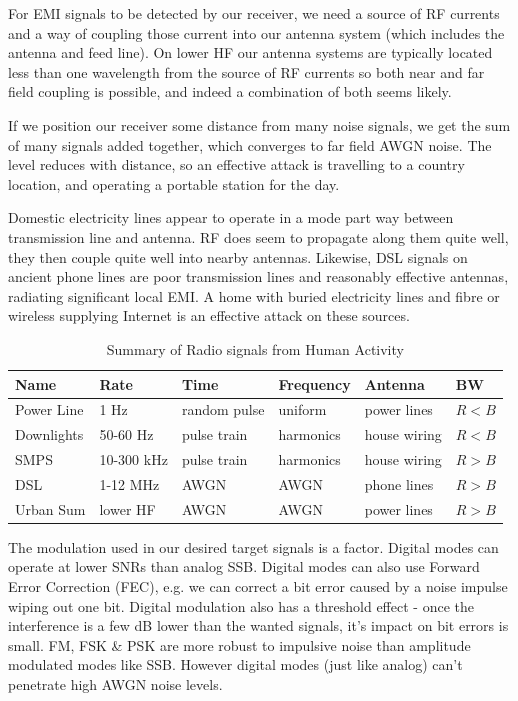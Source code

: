 \documentclass{article}
\begin{document}
For EMI signals to be detected by our receiver, we need a source of RF currents and a way of coupling those current into our antenna system (which includes the antenna and feed line).  On lower HF our antenna systems are typically located less than one wavelength from the source of RF currents so both near and far field coupling is possible, and indeed a combination of both seems likely.

If we position our receiver some distance from many noise signals, we get the sum of many signals added together, which converges to far field AWGN noise.  The level reduces with distance, so an effective attack is travelling to a country location, and operating a portable station for the day.

Domestic electricity lines appear to operate in a mode part way between transmission line and antenna.  RF does seem to propagate along them quite well, they then couple quite well into nearby antennas.  Likewise, DSL signals on ancient phone lines are poor transmission lines and reasonably effective antennas, radiating significant local EMI. A home with buried electricity lines and fibre or wireless supplying Internet is an effective attack on these sources.

\begin{table}[h]
\centering
\begin{tabular}{l l l l l l}
 \hline
 Name & Rate & Time & Frequency & Antenna & BW \\
 \hline
 Power Line & 1 Hz & random pulse & uniform & power lines & $R < B$ \\
 Downlights & 50-60 Hz & pulse train & harmonics & house wiring & $R < B$ \\
 SMPS & 10-300 kHz & pulse train & harmonics & house wiring & $R > B$ \\
 DSL & 1-12 MHz & AWGN & AWGN & phone lines & $R > B$ \\
 Urban Sum & lower HF & AWGN & AWGN & power lines & $R > B$ \\
 \hline
\end{tabular}
\caption{Summary of Radio signals from Human Activity}
\label{table:human_noise}
\end{table}

The modulation used in our desired target signals is a factor.  Digital modes can operate at lower SNRs than analog SSB.  Digital modes can also use Forward Error Correction (FEC), e.g. we can correct a bit error caused by a noise impulse wiping out one bit.  Digital modulation also has a threshold effect - once the interference is a few dB lower than the wanted signals, it's impact on bit errors is small. FM, FSK \& PSK are more robust to impulsive noise than amplitude modulated modes like SSB.  However digital modes (just like analog) can't penetrate high AWGN noise levels.
\end{document}
